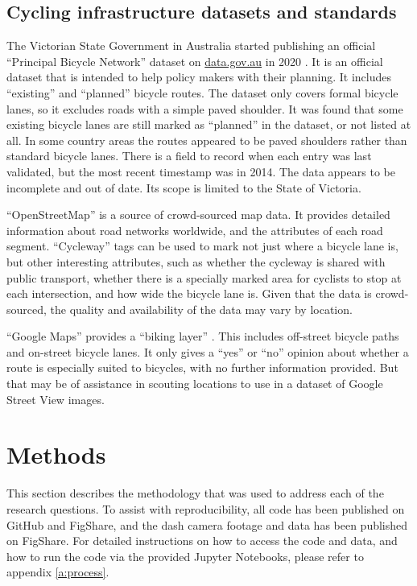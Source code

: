 \documentclass[11pt,twoside]{report}
\begin{document}
\section{Cycling infrastructure datasets and standards}
\label{s:datasets}

The Victorian State Government in Australia started publishing an official ``Principal Bicycle Network'' dataset on \url{data.gov.au} in 2020 \cite{PrincipalBicycleNetwork}.  It is an official dataset that is intended to help policy makers with their planning.  It includes ``existing'' and ``planned'' bicycle routes.  The dataset only covers formal bicycle lanes, so it excludes roads with a simple paved shoulder.  It was found that some existing bicycle lanes are still marked as ``planned'' in the dataset, or not listed at all.  In some country areas the routes appeared to be paved shoulders rather than standard bicycle lanes.  There is a field to record when each entry was last validated, but the most recent timestamp was in 2014.  The data appears to be incomplete and out of date.  Its scope is limited to the State of Victoria.

``OpenStreetMap'' \cite{OPENSTREETMAP} is a source of crowd-sourced map data.  It provides detailed information about road networks worldwide, and the attributes of each road segment.  ``Cycleway'' tags can be used to mark not just where a bicycle lane is, but other interesting attributes, such as whether the cycleway is shared with public transport, whether there is a specially marked area for cyclists to stop at each intersection, and how wide the bicycle lane is.  Given that the data is crowd-sourced, the quality and availability of the data may vary by location.

``Google Maps'' provides a ``biking layer'' \cite{bike_layer}.  This includes off-street bicycle paths and on-street bicycle lanes.  It only gives a ``yes'' or ``no'' opinion about whether a route is especially suited to bicycles, with no further information provided.  But that may be of assistance in scouting locations to use in a dataset of Google Street View images.


\chapter{Methods}
\label{s:methods}


This section describes the methodology that was used to address each of the research questions.  To assist with reproducibility, all code has been published on GitHub and FigShare, and the dash camera footage and data has been published on FigShare.  For detailed instructions on how to access the code and data, and how to run the code via the provided Jupyter Notebooks, please refer to appendix \ref{a:process}.
\end{document}
